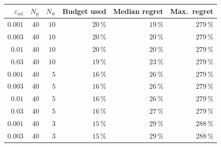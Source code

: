 \begin{tabular}{rrrrrr}
\toprule
$\varepsilon_{\mathrm{rel}}$ & $N_{\mathrm{p}}$ & $N_{\mathrm{w}}$ & Budget used & Median regret & Max.\ regret \\
\midrule
$0.001$ & $40$ & $10$ & $20\,\%$ & $19\,\%$ & $279\,\%$ \\
$0.003$ & $40$ & $10$ & $20\,\%$ & $20\,\%$ & $279\,\%$ \\
$0.01$ & $40$ & $10$ & $20\,\%$ & $20\,\%$ & $279\,\%$ \\
$0.03$ & $40$ & $10$ & $19\,\%$ & $23\,\%$ & $279\,\%$ \\
$0.001$ & $40$ & $5$ & $16\,\%$ & $26\,\%$ & $279\,\%$ \\
$0.003$ & $40$ & $5$ & $16\,\%$ & $26\,\%$ & $279\,\%$ \\
$0.01$ & $40$ & $5$ & $16\,\%$ & $26\,\%$ & $279\,\%$ \\
$0.03$ & $40$ & $5$ & $16\,\%$ & $27\,\%$ & $279\,\%$ \\
$0.001$ & $40$ & $3$ & $15\,\%$ & $29\,\%$ & $288\,\%$ \\
$0.003$ & $40$ & $3$ & $15\,\%$ & $29\,\%$ & $288\,\%$ \\
\bottomrule
\end{tabular}
